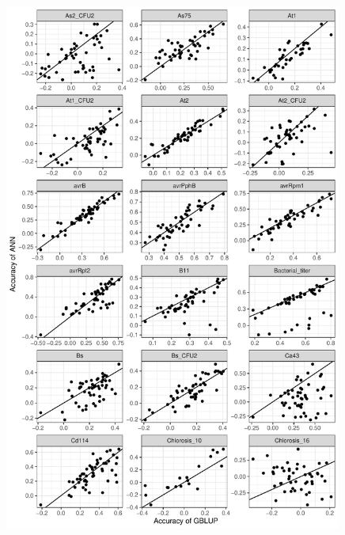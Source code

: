 \begin{figure}[H]
  \centering \includegraphics[height=0.99\textheight, width=0.99\textwidth]{Figures/gray_cor_plots_1}
  \decoRule
 \label{fig:bla}
\end{figure}

